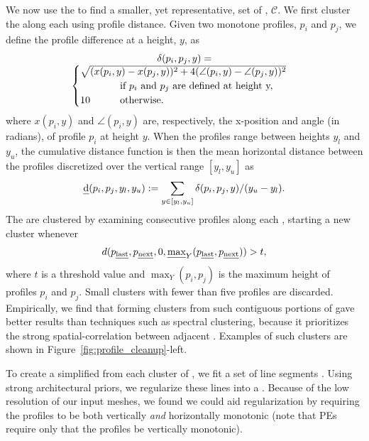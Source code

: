We now use the \rawprofiles to find a smaller, yet representative, set of \cleanprofiles, $\mathcal{C}$.
%
We first cluster the \rawprofiles along each \sweepedge using profile distance. 
Given two monotone profiles, $p_i$ and $p_j$, we define the profile difference at a height, $y$, as
% 
\begin{multline*}
\vspace*{-.06in}
\delta(p_i, p_j, y) =\\
\begin{cases}
    \sqrt{(x(p_i, y) - x(p_j, y))^2 +
    4(\angle (p_i, y) - \angle (p_j,y ) )^2} \\
    \quad\quad\quad\quad \text{if } p_i \text{ and } p_j \text{ are defined at height y,}\\
    10       \quad\quad\quad \text{otherwise.}
\end{cases}
\end{multline*}
%
where $x(p_i, y)$ and  $\angle(p_i, y)$ are, respectively, the x-position and angle (in radians), of profile $p_i$ at height $y$. When the profiles range between heights $y_l$ and $y_u$, the cumulative distance function is then the mean horizontal distance between the profiles discretized over the vertical range $[y_l,y_u]$ as
% 
$$
\text{\emph{d}}(p_i, p_j, y_l, y_u) :=  {\sum_{y \in [y_l,y_u]} \delta(p_i, p_j, y) } / {(y_u-y_l)}.
$$
%
%
The \rawprofiles are clustered by examining consecutive profiles along each \sweepedge, starting a new cluster whenever
$$
d(p_{\text{\emph{last}}}, p_{\text{\emph{next}}}, 0, \text{\emph{max}}_Y(p_{\text{\emph{last}}}, p_{\text{\emph{next}}})) > t,
$$
%
where $t$ is a threshold value and $\max_Y(p_i, p_j)$ is the maximum height of profiles $p_i$ and $p_j$. Small clusters with fewer than five profiles are discarded. Empirically, we find that forming clusters from such contiguous portions of \sweepedges gave better results than techniques such as spectral clustering, because it prioritizes the strong spatial-correlation between adjacent \rawprofiles.
Examples of such clusters are shown in Figure~\ref{fig:profile_cleanup}-left.



To create a simplified \emph{\cleanprofile} from each cluster of \rawprofiles, we fit a set of line segments . Using strong architectural priors, we regularize these lines into a \cleanprofile. Because of the low resolution of our input meshes, we found we could aid regularization by requiring the profiles to be both vertically \emph{and} horizontally monotonic (note that PEs require only that the profiles be vertically monotonic).

